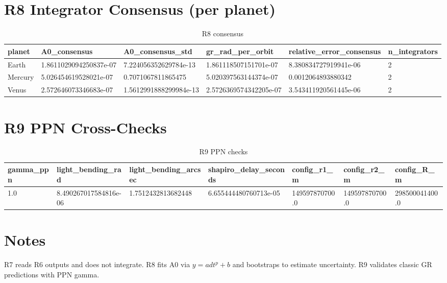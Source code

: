 \documentclass[11pt]{article}
\begin{document}
\section{R8 Integrator Consensus (per planet)}
\begin{table}[h!]
\centering
\caption{R8 consensus}
\label{tab:r8cons}
\begin{tabular}{l | l | l | l | l | l}
\hline
planet & A0_consensus & A0_consensus_std & gr_rad_per_orbit & relative_error_consensus & n_integrators \\
\hline
Earth & 1.8611029094250837e-07 & 7.224056352629784e-13 & 1.861118507151701e-07 & 8.380834727919941e-06 & 2 \\
Mercury & 5.026454619528021e-07 & 0.7071067811865475 & 5.020397563144374e-07 & 0.0012064893880342 & 2 \\
Venus & 2.572646073346683e-07 & 1.5612991888299984e-13 & 2.5726369574342205e-07 & 3.543411920561445e-06 & 2 \\
\hline
\end{tabular}
\end{table}

\section{R9 PPN Cross-Checks}
\begin{table}[h!]
\centering
\caption{R9 PPN checks}
\label{tab:r9}
\begin{tabular}{l | l | l | l | l | l | l}
\hline
gamma_ppn & light_bending_rad & light_bending_arcsec & shapiro_delay_seconds & config_r1_m & config_r2_m & config_R_m \\
\hline
1.0 & 8.490267017584816e-06 & 1.7512432813682448 & 6.655444480760713e-05 & 149597870700.0 & 149597870700.0 & 298500041400.0 \\
\hline
\end{tabular}
\end{table}

\section{Notes}
R7 reads R6 outputs and does not integrate. R8 fits A0 via $y = a dt^p + b$ and bootstraps to estimate uncertainty. R9 validates classic GR predictions with PPN gamma.
\end{document}
